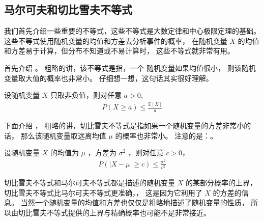 \documentclass[letterpaper,10pt,english]{sphinxmanual}
\begin{document}
\subsection{马尔可夫和切比雪夫不等式}
\label{\detokenize{_u63a8_u65ad_u4e0e_u68c0_u9a8c/content:id7}}
我们首先介绍一些重要的不等式，这些不等式是大数定律和中心极限定理的基础。
这些不等式使用随机变量的均值和方差去分析事件的概率，
在随机变量 \(X\) 的均值和方差易于计算，但分布不知道或不易计算时，
这些不等式就非常有用。

首先介绍  。
粗略的讲，该不等式是指，一个  随机变量如果均值很小，
则该随机变量取大值的概率也非常小。
仔细想一想，这句话其实很好理解。

\begin{sphinxShadowBox}

设随机变量 \(X\) 只取非负值，则对任意 \(a >0\),
\begin{equation}\label{equation:推断与检验/content:推断与检验/content:26}
\begin{split}P(X \geq a) \leq \frac{\mathbb{E}[X]}{a}\end{split}
\end{equation}\end{sphinxShadowBox}

下面介绍  ，
粗略的讲，切比雪夫不等式是指如果一个随机变量的方差非常小的话，
那么该随机变量取远离均值 \(\mu\) 的概率也非常小。
注意的是：。

\begin{sphinxShadowBox}

设随机变量 \(X\) 的均值为 \(\mu\) ，方差为 \(\sigma^2\) ，则对任意 \(c >0\)，
\begin{equation}\label{equation:推断与检验/content:推断与检验/content:27}
\begin{split}P(|X-\mu| \geq c) \leq \frac{\sigma^2}{c^2}\end{split}
\end{equation}\end{sphinxShadowBox}

切比雪夫不等式和马尔可夫不等式都是描述的随机变量 \(X\) 的某部分概率的上界，
切比雪夫不等式比马尔可夫不等式更准确，，
这是因为它利用了 \(X\) 的方差的信息。
当然一个随机变量的均值和方差也仅仅是粗略地描述了随机变量的性质，
所以由切比雪夫不等式提供的上界与精确概率也可能不是非常接近。
\end{document}
